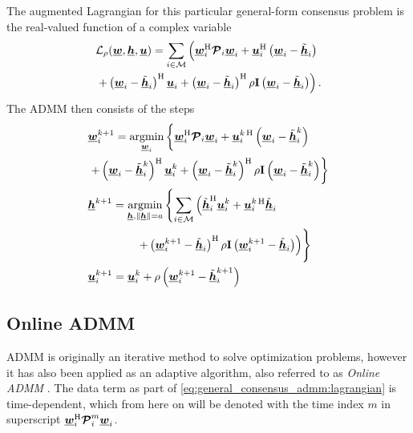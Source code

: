 \documentclass{article}
\newcommand{\hf}{\underline{\bm{h}}}
\newcommand{\wf}{\underline{\bm{w}}}
\newcommand{\uuf}{\underline{\bm{u}}}
\newcommand{\aRhof}{\bm{\mathcal{P}}}
\newcommand{\I}{\mtxb{I}}
\newcommand{\Mset}{\mathcal{M}}
\begin{document}
The augmented Lagrangian for this particular general-form consensus problem is the real-valued function of a complex variable
\begin{align}
    &\mathcal{L}_{\rho} (\wf,\hf,\uuf) = \sum_{i \in \Mset} \left( \wf_i^\herm \aRhof_i \wf_i + \uuf_i^{\herm} \left(\wf_i - \tilde{\hf}_i\right)\vphantom{+ \frac{\rho}{2} \left\| \wf_i - \tilde{\hf}_i \right\|^2} \right.\nonumber\\
    &\left. + \left(\wf_i - \tilde{\hf}_i\right)^\herm \uuf_i + \left( \wf_i - \tilde{\hf}_i \right)^\herm \rho \I \left( \wf_i - \tilde{\hf}_i \right) \right).\label{eq:general_consensus_admm:lagrangian}
\end{align}
The ADMM then consists of the steps
\begin{align}
    &\wf_i^{k+1} = \underset{\wf_i}{\operatorname{argmin}} \left\{ \wf_i^\herm \aRhof_i \wf_i + \uuf_i^{k\,\herm} \left(\wf_i - \tilde{\hf}_i^{k}\right) \vphantom{+ \left\| \wf_i - \tilde{\hf}_i^{k} \right\|^2}\right.\nonumber\\
    &\left.+ \left(\wf_i - \tilde{\hf}_i^{k}\right)^\herm \uuf_i^{k} + \left( \wf_i - \tilde{\hf}_i^{k} \right)^\herm \rho \I \left( \wf_i - \tilde{\hf}_i^{k} \right) \right\}\label{eq:general_consensus_admm:local}\\
    &\hf^{k+1} = \underset{\hf, \|\hf\| = a}{\operatorname{argmin}} \left\{ \sum_{i \in \Mset} \left( \tilde{\hf}_i^{\herm} \uuf_i^{k} + \uuf_i^{k\,\herm} \tilde{\hf}_i \vphantom{\frac{\rho}{2} \| \wf_i^{k+1} - \tilde{\hf}_i \|^2} \right.\right.\nonumber\\
    &\left. \qquad \qquad \vphantom{\sum_{i=1}^{M} pp } \left.+ \left( \wf_i^{k+1} - \tilde{\hf}_i \right)^\herm \rho \I \left( \wf_i^{k+1} - \tilde{\hf}_i \right)  \right) \right\}\label{eq:general_consensus_admm:global}\\
    &\uuf_i^{k+1} = \uuf_i^{k} + \rho \left( \wf_i^{k+1} - \tilde{\hf}_i^{k+1} \right)\label{eq:general_consensus_admm:dual}
\end{align}

\subsection{Online ADMM}
\label{ssec:online_admm}
ADMM is originally an iterative method to solve optimization problems, however it has also been applied as an adaptive algorithm, also referred to as \emph{Online ADMM} \cite{}. The data term as part of \eqref{eq:general_consensus_admm:lagrangian} is time-dependent, which from here on will be denoted with the time index \(m\) in superscript \(\wf_i^\herm \aRhof_i^{m} \wf_i\).
\end{document}
